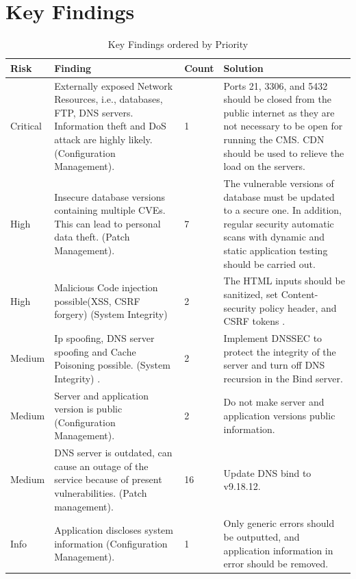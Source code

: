 \section{Key Findings}
\begingroup
\centering
\setlength{\tabcolsep}{6.5pt} %
\renewcommand{\arraystretch}{1.8} %
\begin{longtable}{ |p{1.5cm}| p{6cm}|p{1.3cm}|p{5cm}|}
\caption{Key Findings ordered by Priority}
    \label{table:key_findings}
\hline
\rowcolor{grey!15}
\textbf{Risk}  & \textbf{Finding}& \textbf{Count}& \textbf{Solution}\\
\hline
\cellcolor{red!95} Critical  & Externally exposed Network Resources, i.e., databases, FTP, DNS servers. Information theft and DoS attack are highly likely.
\newline (Configuration Management). & 1 & Ports 21, 3306, and 5432 should be closed from the public internet as they are not necessary to be open for running the CMS. CDN should be used to relieve the load on the servers.
\\
\hline
\cellcolor{red!70} High  & Insecure database versions  containing multiple CVEs. This can lead to personal data theft.
\newline (Patch Management).& 7 & The vulnerable versions of database must be updated to a secure one. In addition, regular security automatic scans with dynamic and static application testing should be carried out.
\\
\hline
\cellcolor{red!70} High  & Malicious Code injection possible(XSS, CSRF forgery) 
\newline (System Integrity)& 2 & The HTML inputs should be sanitized, set Content-security policy header, and CSRF tokens \citep[p.~75]{xss_crsf}.
\\
\hline
\cellcolor{yellow!95} Medium  & Ip spoofing, DNS server spoofing and Cache Poisoning possible.
\newline (System Integrity) .& 2 & Implement DNSSEC to protect the integrity of the server and turn off DNS recursion in the Bind server. \citep[p.~38]{guo2006spoof}
\\
\hline
\cellcolor{yellow!95} Medium  & Server and application version is public 
\newline(Configuration Management).& 2 & Do not make server and application versions public information.
\\
\hline
\cellcolor{yellow!95} Medium  & DNS server is outdated, can cause an outage of the service because of present vulnerabilities.
\newline (Patch management).& 16 & Update DNS bind to v9.18.12.
\\
\hline
\cellcolor{grey!55} Info  & Application discloses system information
\newline (Configuration Management).& 1 & Only generic errors should be outputted, and application information in error should be removed.
\\
\hline
\end{longtable}
\endgroup
\newpage